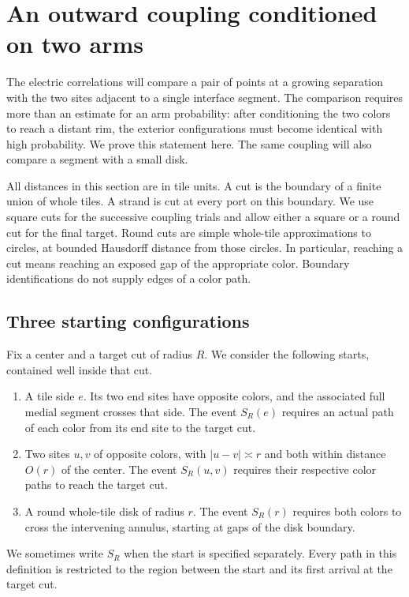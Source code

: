 \section{An outward coupling conditioned on two arms}
\label{sec:coupling}

The electric correlations will compare a pair of points at a growing
separation with the two sites adjacent to a single interface segment.
The comparison requires more than an estimate for an arm probability:
after conditioning the two colors to reach a distant rim, the exterior
configurations must become identical with high probability.  We prove
this statement here.  The same coupling will also compare a segment
with a small disk.

All distances in this section are in tile units.  A cut is the boundary
of a finite union of whole tiles.  A strand is cut at every port on this
boundary.  We use square cuts for the successive coupling trials and
allow either a square or a round cut for the final target.  Round cuts
are simple whole-tile approximations to circles, at bounded Hausdorff
distance from those circles.  In particular, reaching a cut means
reaching an exposed gap of the appropriate color.  Boundary
identifications do not supply edges of a color path.

\subsection{Three starting configurations}

Fix a center and a target cut of radius $R$.  We consider the following
starts, contained well inside that cut.
\begin{enumerate}[label=\textup{(\roman*)}]
\item A tile side $e$.  Its two end sites have opposite colors, and the
associated full medial segment crosses that side.  The event $S_R(e)$
requires an actual path of each color from its end site to the target
cut.
\item Two sites $u,v$ of opposite colors, with $|u-v|\asymp r$ and both
within distance $O(r)$ of the center.  The event $S_R(u,v)$ requires
their respective color paths to reach the target cut.
\item A round whole-tile disk of radius $r$.  The event $S_R(r)$ requires
both colors to cross the intervening annulus, starting at gaps of the
disk boundary.
\end{enumerate}
We sometimes write $S_R$ when the start is specified separately.  Every
path in this definition is restricted to the region between the start
and its first arrival at the target cut.

